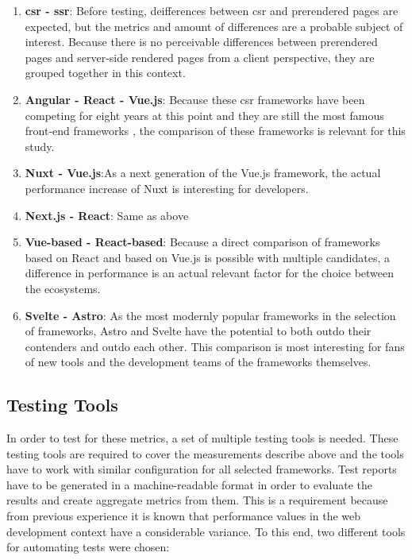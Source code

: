 \documentclass[a4paper, 10pt]{article}
\begin{document}
\begin{enumerate}
  \item \textbf{\acrshort{csr} - \acrshort{ssr}}: Before testing, deifferences between \acrshort{csr} and prerendered pages are expected, but the metrics and amount of differences are a probable subject of interest.
  Because there is no perceivable differences between prerendered  pages and server-side rendered pages from a client perspective, they are grouped together in this context.
  \item \textbf{Angular - React - Vue.js}: Because these \acrshort{csr} frameworks have been competing for eight years at this point and they are still the most famous front-end frameworks \citep{stateOfJs2023}, the comparison of these frameworks is relevant for this study.
  \item \textbf{Nuxt - Vue.js}:As a next generation of the Vue.js framework, the actual performance increase of Nuxt is interesting for developers.
  \item \textbf{Next.js - React}: Same as above
  \item \textbf{Vue-based - React-based}: Because a direct comparison of frameworks based on React and based on Vue.js is possible with multiple candidates, a difference in performance is an actual relevant factor for the choice between the ecosystems.
  \item \textbf{Svelte - Astro}: As the most modernly popular frameworks in the selection of frameworks, Astro and Svelte have the potential to both outdo their contenders and outdo each other.
  This comparison is most interesting for fans of new tools and the development teams of the frameworks themselves.
\end{enumerate}

\subsection{Testing Tools}\label{subsec:testingtools}
% 
% 

In order to test for these metrics, a set of multiple testing tools is needed.
These testing tools are required to cover the measurements describe above and the tools have to work with similar configuration for all selected frameworks.
Test reports have to be generated in a machine-readable format in order to evaluate the results and create aggregate metrics from them.
This is a requirement because from previous experience it is known that performance values in the web development context have a considerable variance.
To this end, two different tools for automating tests were chosen:
\end{document}
